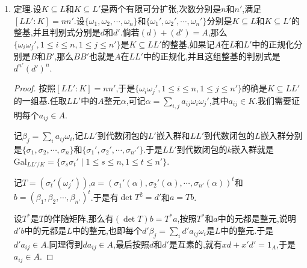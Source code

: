 \begin{enumerate}
\begin{proof}
    	首先取$K$线性空间$L$的一组基$\{u_1,u_2,\cdots,u_n\}$,不妨约定$u_i\in B$(否则可取某个$A$中的元$d$使得每个$du_i\in B$).按照扩张是有限可分的,说明迹二次型$(x,y)=\mathrm{T}_{F/k}(xy):F\times F\to K$是非退化的,于是可取这组基$\{u_1,u_2,\cdots,u_n\}$的对偶基$\{w_1,w_2,\cdots,w_n\}\subseteq F$,此即满足$(u_i,w_j)=\delta_{ij}$的一组基.
    	
    	现在我们断言$B\subseteq C=Aw_1+Aw_2+\cdots+Aw_n$,导致$B$是$A$模$C$的子模,按照$C$是诺特环上的有限生成模,说明它是诺特模,于是$B$作为$A$模是有限生成的.
    	
    	任取$x\in B$,可记$x=\sum_jx_jw_j$,其中$x_j\in K$,需要证明每个$x_j\in A$.按照$xv_i\in B$,说明$\mathrm{T}_{F/k}(xv_i)\in A$.但是$\mathrm{T}_{F/k}(xv_i)=\sum_j\mathrm{T}_{F/k}(x_jw_jv_j)=\sum_jx_j\mathrm{T}_{F/k}(v_jw_i)=x_i$,于是每个$x_i\in A$.
    \end{proof}
    \item 定理.设$K\subseteq L$和$K\subseteq L'$是两个有限可分扩张,次数分别是$n$和$n'$,满足$[LL':K]=nn'$.设$\{\omega_1,\omega_2,\cdots,\omega_n\}$和$\{\omega_1',\omega_2',\cdots,\omega_n'\}$分别是$K\subseteq L$和$K\subseteq L'$的整基,并且判别式分别是$d$和$d'$.倘若$(d)+(d')=A$,那么$\{\omega_i\omega_j',1\le i\le n,1\le j\le n'\}$是$K\subseteq LL'$的整基,如果记$A$在$L$和$L'$中的正规化分别是$B$和$B'$,那么$BB'$也就是$A$在$LL'$中的正规化,并且这组整基的判别式是$d^{n'}(d')^n$.
    \begin{proof}
    	
    	按照$[LL':K]=nn'$,于是$\{\omega_i\omega_j',1\le i\le n,1\le j\le n'\}$的确是$K\subseteq LL'$的一组基.任取$LL'$中的$A$整元$\alpha$,可记$\alpha=\sum_{i,j}a_{ij}\omega_i\omega_j'$,其中$a_{ij}\in K$.我们需要证明每个$a_{ij}\in A$.
    	
    	记$\beta_j=\sum_ia_{ij}\omega_i$,记$LL'$到代数闭包的$L'$嵌入群和$LL'$到代数闭包的$L$嵌入群分别是$\{\sigma_1,\sigma_2,\cdots,\sigma_n\}$和$\{\sigma_1',\sigma_2',\cdots,\sigma_{n'}'\}$.于是$LL'$到代数闭包的$k$嵌入群就是$\mathrm{Gal}_{LL'/K}=\{\sigma_s\sigma_t'\mid 1\le s\le n,1\le t\le n'\}$.
    	
    	记$T=(\sigma_t'(\omega_j'))$,$a=(\sigma_1'(\alpha),\sigma_2'(\alpha),\cdots,\sigma_{n'}(\alpha))^t$和$b=(\beta_1,\beta_2,\cdots,\beta_{n'})^t$.于是有$\det T^2=d'$和$a=Tb$.
    	
    	设$T^*$是$T$的伴随矩阵,那么有$(\det T)b=T^*a$,按照$T^*$和$a$中的元都是整元,说明$d'b$中的元都是$L$中的整元,也即每个$d'\beta_j=\sum_id'a_{ij}\omega_i$是$L$中的整元.于是$d'a_{ij}\in A$.同理得到$da_{ij}\in A$,最后按照$d$和$d'$是互素的,就有$xd+x'd'=1_A$,于是$a_{ij}\in A$.
    	

\end{proof}
\end{enumerate}
